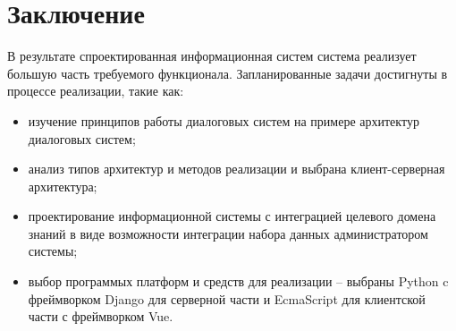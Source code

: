 \chapter*{Заключение}

В результате спроектированная  информационная систем система реализует большую часть требуемого функционала. Запланированные задачи достигнуты в процессе реализации, такие как: 

\begin{itemize}
\item изучение принципов работы диалоговых систем на примере архитектур диалоговых систем;
\item анализ типов архитектур и методов реализации и выбрана клиент-серверная архитектура;
\item проектирование информационной системы с интеграцией целевого домена знаний в виде возможности интеграции набора данных администратором системы;  
\item выбор программых платформ и средств для реализации -- выбраны Python c фреймворком Django для серверной части и EcmaScript для клиентской части с фреймворком Vue.
\end{itemize}


